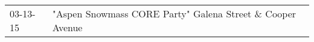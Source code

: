 \begin{supertabular}{p{0.25\columnwidth}p{0.75\columnwidth}}
 03-13-15 &  "Aspen Snowmass CORE Party" Galena Street \& Cooper Avenue \\
\end{supertabular}
